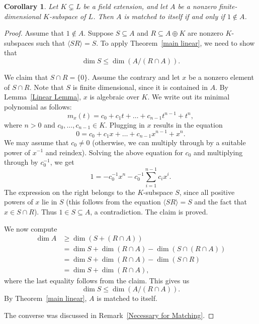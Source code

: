 \documentclass[11pt]{amsart}
\newtheorem{corollary}[theorem]{Corollary}
\theoremstyle{definition}
\theoremstyle{remark}
\begin{document}
\begin{corollary}\label{sym lin match}
    Let \( K \subsetneq L \) be a field extension, and let \( A \) be a nonzero finite-dimensional \( K \)-subspace of \( L \). Then \( A \) is matched to itself if and only if \( 1 \notin A \).
\end{corollary}

\begin{proof}
Assume that \( 1 \notin A \). Suppose \( S \subseteq A \) and \( R \subseteq A \oplus K \) are nonzero \( K \)-subspaces such that \( \langle SR \rangle = S \). To apply Theorem~\ref{main linear}, we need to show that
\[
\dim S \leq \dim (A/(R \cap A)).
\]

\medskip

We claim that \( S \cap R = \{ 0 \} \).  Assume the contrary and let \( x \) be a nonzero element of \( S \cap R \).  Note that \( S \) is finite dimensional, since it is contained in \( A \). By Lemma~\ref{Linear Lemma},  \( x \) is algebraic over \( K \). We write out its minimal polynomial as follows:
\[ m_x(t) = c_0 + c_1 t + \ldots + c_{n-1} t^{n-1} + t^n,
\]
where \( n > 0 \) and \( c_0, \ldots , c_{n-1} \in K \). Plugging in \( x \) results in the equation
\[
0 = c_0 + c_1 x + \ldots + c_{n-1} x^{n-1} + x^n.
\]
We may assume that \( c_0 \neq 0 \) (otherwise, we can multiply through by a suitable power of \( x^{-1} \) and reindex).  Solving the above equation for \( c_0 \) and multiplying through by \( c_0^{-1} \), we get
\[
1 = -c_0^{-1}x^n - c_0^{-1} \sum_{i=1}^{n-1} c_i x^i.
\]
The expression on the right belongs to the \( K \)-subspace \(  S \), since all positive powers of \( x \) lie in \( S \) (this follows from the equation \( \langle SR \rangle = S \) and the fact that \( x \in S \cap R \)). Thus \( 1 \in S \subseteq A \), a contradiction.  The claim is proved.

\medskip

We now compute
\begin{align*}
\dim A &\geq \dim (S + (R \cap A)) \\ 
&= \dim S + \dim (R \cap A) - \dim (S \cap (R \cap A)) \\
&= \dim S + \dim (R \cap A) - \dim (S \cap R) \\
&= \dim S + \dim (R \cap A),
\end{align*}
where the last equality follows from the claim. This gives us
\[
\dim S \leq \dim (A/(R \cap A)).
\]
By Theorem~\ref{main linear}, \( A \) is matched to itself. 

The converse was discussed in Remark~\ref{Necessary for Matching}.
\end{proof}
\end{document}
